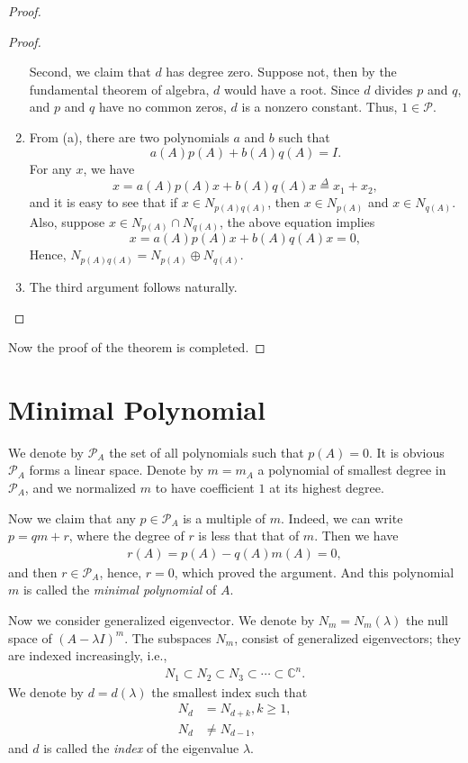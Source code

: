 \documentclass[10pt]{book}
\theoremstyle{definition}
\numberwithin{equation}{chapter}
\begin{document}
\begin{proof}
\begin{proof}
\begin{enumerate}[label=(\alph*)]
    Second, we claim that $d$ has degree zero. Suppose not, then by the fundamental theorem of algebra, $d$ would have a root. Since $d$ divides $p$ and $q$, and $p$ and $q$ have no common zeros, $d$ is a nonzero constant. Thus, $1\in \mathcal{P}$.
    \item From (a), there are two polynomials $a$ and $b$ such that 
    $$a(A)p(A) + b(A)q(A) = I.$$
    For any $x$, we have
    $$x = a(A)p(A)x + b(A)q(A)x \overset{\Delta}{=} x_1 + x_2, $$
    and it is easy to see that if $x\in N_{p(A)q(A)}$, then $x\in N_{p(A)}$ and $x\in N_{q(A)}$. Also, suppose $x\in N_{p(A)}\cap N_{q(A)}$, the above equation implies 
    $$x = a(A)p(A)x + b(A)q(A)x = 0,$$
    Hence, $N_{p(A)q(A)} = N_{p(A)} \oplus N_{q(A)}$.
    \item The third argument follows naturally.
\end{enumerate}
\end{proof}
Now the proof of the theorem is completed.
\end{proof}

\medskip

\section{Minimal Polynomial}

We denote by $\mathcal{P}_A$ the set of all polynomials such that $p(A) = 0$. It is obvious $\mathcal{P}_A$ forms a linear space. Denote by $m = m_A$ a polynomial of smallest degree in $\mathcal{P}_A$, and we normalized $m$ to have coefficient $1$ at its highest degree. 

Now we claim that any $p\in\mathcal{P}_A$ is a multiple of $m$. Indeed, we can write $p = qm +r$, where the degree of $r$ is less that that of $m$. Then we have 
\begin{align*}
    r(A) = p(A) - q(A)m(A) = 0,
\end{align*}
and then $r\in\mathcal{P}_A$, hence, $r = 0$, which proved the argument. And this polynomial $m$ is called the \emph{minimal polynomial} of $A$.

Now we consider generalized eigenvector. We denote by $N_m = N_m(\lambda)$ the null space of $(A - \lambda I)^m$. The subspaces
$N_m$, consist of generalized eigenvectors; they are indexed increasingly, i.e.,
\begin{align*}
    N_1\subset N_2 \subset N_3 \subset \cdots \subset \mathbb{C}^n.
\end{align*}
We denote by $d = d(\lambda)$ the smallest index such that
\begin{align*}
    N_d & = N_{d+k}, k\geq 1, \\
    N_d & \neq N_{d-1},
\end{align*}
and $d$ is called the \emph{index} of the eigenvalue $\lambda$.
\end{document}
